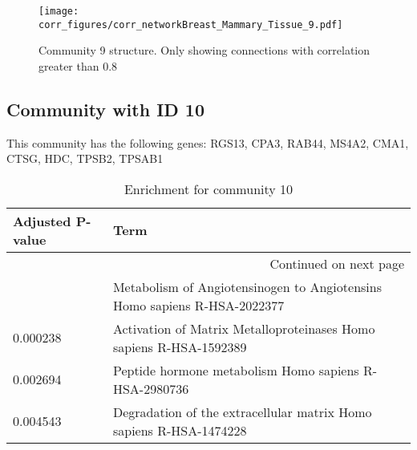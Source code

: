 \begin{figure}[h!]
\centering
\texttt{[image: corr\_figures/corr\_networkBreast\_Mammary\_Tissue\_9.pdf]}
\caption{Community 9 structure. Only showing connections with correlation greater than 0.8}
\end{figure}




\subsection*{Community with ID 10}
This community has the following genes: RGS13, CPA3, RAB44, MS4A2, CMA1, CTSG, HDC, TPSB2, TPSAB1
\\
\begin{longtable}{p{2.4cm}p{14.5cm}}
\caption{Enrichment for community 10}\\
\toprule
Adjusted \newline P-value &                                                                      Term \\
\midrule
\endhead
\midrule
\multicolumn{2}{r}{{Continued on next page}} \\
\midrule
\endfoot

\bottomrule
\endlastfoot
                 0.000054 &  Metabolism of Angiotensinogen to Angiotensins Homo sapiens R-HSA-2022377 \\
                 0.000238 &        Activation of Matrix Metalloproteinases Homo sapiens R-HSA-1592389 \\
                 0.002694 &                     Peptide hormone metabolism Homo sapiens R-HSA-2980736 \\
                 0.004543 &        Degradation of the extracellular matrix Homo sapiens R-HSA-1474228 \\
\end{longtable}


